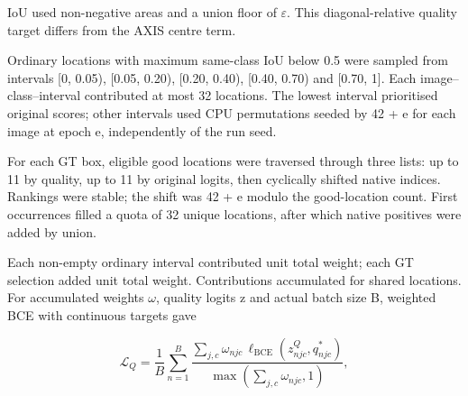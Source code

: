 IoU used non-negative areas and a union floor of \(\varepsilon\). This diagonal-relative quality target differs from the AXIS centre term.

Ordinary locations with maximum same-class IoU below 0.5 were sampled from intervals [0, 0.05), [0.05, 0.20), [0.20, 0.40), [0.40, 0.70) and [0.70, 1]. Each image–class–interval contributed at most 32 locations. The lowest interval prioritised original scores; other intervals used CPU permutations seeded by 42 + e for each image at epoch e, independently of the run seed.

For each GT box, eligible good locations were traversed through three lists: up to 11 by quality, up to 11 by original logits, then cyclically shifted native indices. Rankings were stable; the shift was 42 + e modulo the good-location count. First occurrences filled a quota of 32 unique locations, after which native positives were added by union.

Each non-empty ordinary interval contributed unit total weight; each GT selection added unit total weight. Contributions accumulated for shared locations. For accumulated weights \(\omega\), quality logits z and actual batch size B, weighted BCE with continuous targets gave

\[
\mathcal L_Q=
\frac{1}{B}\sum_{n=1}^{B}
\frac{
\sum_{j,c}\omega_{njc}\,
\ell_{\mathrm{BCE}}(z^Q_{njc},q^*_{njc})
}{\max\left(\sum_{j,c}\omega_{njc},1\right)},
\]

\FloatBarrier
